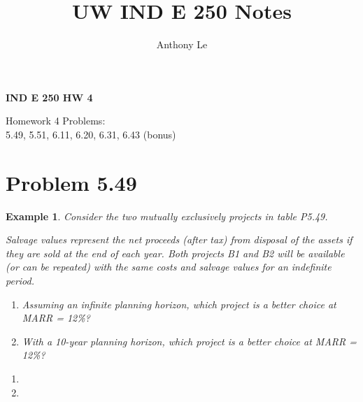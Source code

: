 \documentclass{report} %
\title{UW IND E 250 Notes}
\author{Anthony Le}
\newtheorem{exmp}{Example}
\begin{document}
\pagestyle{fancy}
\fancyhead{}


\newpage

\newpage

\newpage
\begin{center}
    \LARGE{\textbf{IND E 250 HW 4}}
\end{center}
\begin{center}
    Homework 4 Problems: \\
    5.49, 5.51, 6.11, 6.20, 6.31, 6.43 (bonus)
\end{center}

\section*{Problem 5.49}
\begin{exmp}
    Consider the two mutually exclusively projects in table P5.49.

    Salvage values represent the net proceeds (after tax) from disposal of the assets if they are sold at the end of each year. Both projects B1 and B2 will be available (or can be repeated) with the same costs and salvage values for an indefinite period. 
    \begin{enumerate}
        \item Assuming an infinite planning horizon, which project is a better choice at MARR = 12\%?
        \item With a 10-year planning horizon, which project is a better choice at MARR = 12\%?
    \end{enumerate}
\end{exmp}
\begin{enumerate}
    \item {}
    \item {}
\end{enumerate}
\end{document}

